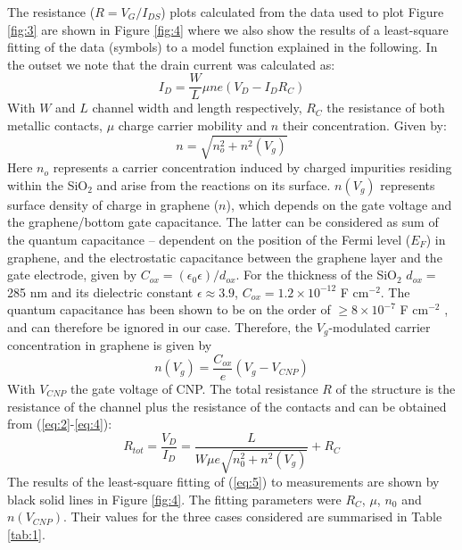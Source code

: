 \documentclass[preprint,aip,jap]{revtex4-2}
\begin{document}
The resistance ($R=V_{G}/I_{DS}$) plots calculated from the data used to plot Figure \ref{fig:3} are shown in Figure \ref{fig:4} where we also show the results of a least-square fitting of the data (symbols) to a model function explained in the following.
In the outset we note that the drain current was calculated as:
  \begin{equation}
    \label{eq:2}
    I_{D}=\frac{W}{L}\mu n e(V_{D}- I_{D}R_{C})
  \end{equation}
  \noindent With $W$ and $L$ channel width and length respectively, $R_{C}$ the resistance of both metallic contacts, $\mu$ charge carrier mobility and $n$ their concentration.
   Given by:
  \begin{equation}
    \label{eq:3}
    n=\sqrt{n_{o}^{2}+n^{2}(V_{g})}
  \end{equation}
 Here $n_o$ represents a carrier concentration induced by charged impurities residing within the SiO$_{2}$ and arise from the reactions on its surface\cite{adam-2007}.
 $n(V_{g})$ represents surface density of charge in graphene ($n$), which depends on the gate voltage and the graphene/bottom gate capacitance.
The latter can be considered as sum of  the quantum capacitance -- dependent on the position of the  Fermi level ($E_F$)  in  graphene, 
 and the electrostatic  capacitance between the graphene layer and the gate electrode, given by $C_{ox}=(\epsilon_0\epsilon)/d_{ox}$\cite{sze-2006}.
 For the thickness of the SiO$_{2}$ $d_{ox}=$285 nm and its dielectric constant  $\epsilon \approx 3.9$,  $C_{ox}=1.2\times10^{-12}$ F cm$^{-2}$.
 The quantum capacitance has been shown to be on the order of $ \geq 8 \times10^{-7}$ F cm$^{-2}$ \cite{xia_2009}, and can therefore be ignored in our case\cite{das-2008}. 
 Therefore, the $V_{g}$-modulated carrier concentration in graphene is given by
 \begin{equation}
   \label{eq:4}
   n(V_{g})= \frac{C_{ox}}{e}(V_{g}- V_{CNP})
 \end{equation}
 \noindent With $V_{CNP}$ the gate voltage of CNP\cite{xia-2010}.
 The total resistance $R$ of the structure is the resistance of the  channel plus the resistance of the contacts and can be  obtained from (\ref{eq:2}-\ref{eq:4}):	
 \begin{equation}
	 \label{eq:5}
     R_{tot} = \frac{V_{D}}{I_{D}} = \frac{L}{W\mu e\sqrt{n_{0}^{2}+n^{2}(V_{g})}} +R_{C}
 \end{equation}
 \noindent The results of the least-square fitting of (\ref{eq:5}) to measurements are shown by black solid lines in Figure \ref{fig:4}. The fitting parameters were $R_{C}$, $\mu$, $n_0$ and $n(V_{CNP})$.
 Their  values for the three cases considered are summarised in Table \ref{tab:1}.
\end{document}
